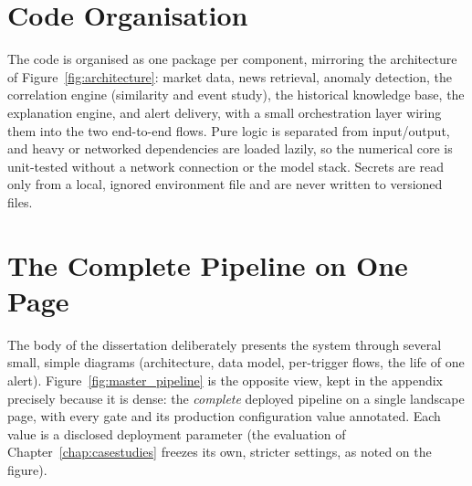 \section{Code Organisation}
\label{app:repro_repo}

The code is organised as one package per component, mirroring the architecture of
Figure~\ref{fig:architecture}: market data, news retrieval, anomaly detection, the correlation engine
(similarity and event study), the historical knowledge base, the explanation engine, and alert delivery,
with a small orchestration layer wiring them into the two end-to-end flows. Pure logic is separated from
input/output, and heavy or networked dependencies are loaded lazily, so the numerical core is unit-tested
without a network connection or the model stack. Secrets are read only from a local, ignored environment
file and are never written to versioned files.

\section{The Complete Pipeline on One Page}
\label{app:repro_pipeline}

The body of the dissertation deliberately presents the system through several small, simple diagrams
(architecture, data model, per-trigger flows, the life of one alert). Figure~\ref{fig:master_pipeline}
is the opposite view, kept in the appendix precisely because it is dense: the \emph{complete} deployed
pipeline on a single landscape page, with every gate and its production configuration value annotated.
Each value is a disclosed deployment parameter (the evaluation of Chapter~\ref{chap:casestudies} freezes
its own, stricter settings, as noted on the figure).

